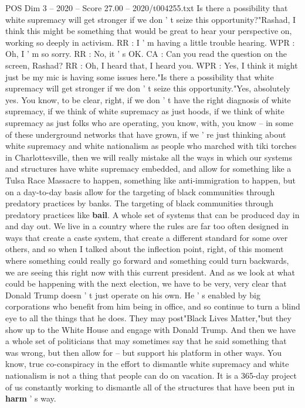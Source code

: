 \begin{textsample}{POS Dim 3 – 2020 – Score 27.00 – 2020/t004255.txt}
Is there a possibility that white supremacy will get stronger if we don ' t seize this opportunity?"Rashad, I think this might be something that would be great to hear your perspective on, working so deeply in activism.
RR : I ' m having a little trouble hearing.
WPR : Oh, I ' m so sorry.
RR : No, it ' s OK.
CA : Can you read the question on the screen, Rashad?
RR : Oh, I heard that, I heard you.
WPR : Yes, I think it might just be my mic is having some issues here."Is there a possibility that white supremacy will get stronger if we don ' t seize this opportunity."Yes, absolutely yes.
You know, to be clear, right, if we don ' t have the right diagnosis of white supremacy, if we think of white supremacy as just hoods, if we think of white supremacy as just folks who are operating, you know, with, you know -- in some of these underground networks that have grown, if we ' re just thinking about white supremacy and white nationalism as people who marched with tiki torches in Charlottesville, then we will really mistake all the ways in which our systems and structures have white supremacy embedded, and allow for something like a Tulsa Race Massacre to happen, something like anti-immigration to happen, but on a day-to-day basis allow for the targeting of black communities through predatory practices by banks.
The targeting of black communities through predatory practices like \textbf{bail}.
A whole set of systems that can be produced day in and day out.
We live in a country where the rules are far too often designed in ways that create a caste system, that create a different standard for some over others, and so when I talked about the inflection point, right, of this moment where something could really go forward and something could turn backwards, we are seeing this right now with this current president.
And as we look at what could be happening with the next election, we have to be very, very clear that Donald Trump doesn ' t just operate on his own.
He ' s enabled by big corporations who benefit from him being in office, and so continue to turn a blind eye to all the things that he does.
They may post"Black Lives Matter,"but they show up to the White House and engage with Donald Trump.
And then we have a whole set of politicians that may sometimes say that he said something that was wrong, but then allow for -- but support his platform in other ways.
You know, true co-conspiracy in the effort to dismantle white supremacy and white nationalism is not a thing that people can do on vacation.
It is a 365-day project of us constantly working to dismantle all of the structures that have been put in \textbf{harm} ' s way.

\end{textsample}
